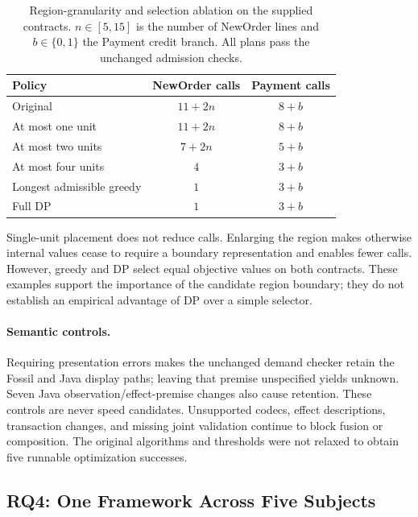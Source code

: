 \documentclass[acmsmall,screen,review,anonymous]{acmart}
\begin{document}
\begin{table}[t]
\caption{Region-granularity and selection ablation on the supplied contracts.
$n\in[5,15]$ is the number of NewOrder lines and $b\in\{0,1\}$ the Payment
credit branch. All plans pass the unchanged admission checks.}
\label{tab:placement-ablation}
\small
\begin{tabular}{@{}lcc@{}}
\toprule
Policy & NewOrder calls & Payment calls \\
\midrule
Original & $11+2n$ & $8+b$ \\
At most one unit & $11+2n$ & $8+b$ \\
At most two units & $7+2n$ & $5+b$ \\
At most four units & $4$ & $3+b$ \\
Longest admissible greedy & $1$ & $3+b$ \\
Full DP & $1$ & $3+b$ \\
\bottomrule
\end{tabular}
\end{table}

Single-unit placement does not reduce calls. Enlarging the region makes
otherwise internal values cease to require a boundary representation and
enables fewer calls. However, greedy and DP select equal objective values
on both contracts. These examples support the importance of the candidate
region boundary; they do not establish an empirical advantage of DP over
a simple selector.


\paragraph{Semantic controls.}
Requiring presentation errors makes the unchanged demand checker retain the
Fossil and Java display paths; leaving that premise unspecified yields unknown.
Seven Java observation/effect-premise changes also cause retention. These
controls are never speed candidates. Unsupported codecs, effect descriptions,
transaction changes, and missing joint validation continue to block fusion or
composition. The original algorithms and thresholds were not relaxed to obtain
five runnable optimization successes.

\subsection{RQ4: One Framework Across Five Subjects}
\begin{table}[t]
\caption{Unchanged policy applied to fresh development-subject measurements.
Ratios compare each selected alternative with its own baseline. Three subjects
retain original on admission grounds; their experimental timing cannot override
that decision. Selection and reporting use the same blocks, not held-out costs.}
\label{tab:selection}
\small\SelectionResults
\end{table}
\end{document}
